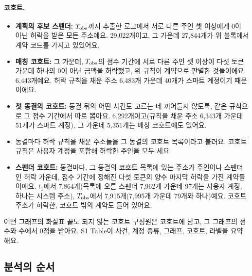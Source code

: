 \paragraph{코호트.}
\begin{itemize}
\item \textbf{계획의 후보 스펜더:} $T_{\mathrm{obs}}$까지 추출한 로그에서 서로 다른 주인 셋 이상에게 0이 아닌 허락을 받은 모든 주소예요. 29,022개이고, 그 가운데 27,844개가 위 블록에서 계약 코드를 가지고 있었어요.
\item \textbf{매칭 코호트:} 그 가운데, $T_{\mathrm{obs}}$의 점수 기간에 서로 다른 주인 셋 이상이 다섯 토큰 가운데 하나의 0이 아닌 금액을 허락했고, 위 규칙이 계약으로 판별한 것들이에요. 6,443개예요. 허락 규칙을 채운 주소 6,483개 가운데 40개가 스마트 계정이기 때문이에요.
\item \textbf{첫 동결의 코호트:} 동결 뒤의 어떤 사건도 고르는 데 끼어들지 않도록, 같은 규칙으로 그 점수 기간에서 따로 뽑아요. 6,292개이고(규칙을 채운 주소 6,343개 가운데 51개가 스마트 계정), 그 가운데 5,351개는 매칭 코호트에도 있어요.
\item 동결마다 허락 규칙을 채운 주소들을 그 동결의 코호트 목록이라고 불러요. 코호트 규칙은 사용자 계정을 포함해 허락한 주인을 모두 세요.
\item \textbf{스펜더 코호트:} 동결마다, 그 동결의 코호트 목록에 있는 주소가 주인이나 스펜더인 허락 가운데, 점수 기간에 정해진 다섯 토큰의 양수 마지막 허락을 가진 계약들이에요. $t_1$에서 7,864개(목록에 오른 스펜더 7,962개 가운데 97개는 사용자 계정, 하나는 시스템 주소), $T_{\mathrm{obs}}$에서 7,915개(7,995개 가운데 79개와 하나)예요. 코호트 주소가 허락한, 코호트 밖의 계약도 들어 있어요.
\end{itemize}
어떤 그래프의 화살표 끝도 되지 않는 코호트 구성원은 코호트에 남고, 그 그래프의 점수와 수에서 0점을 받아요. S1 Table이 사건, 계정 종류, 그래프, 코호트, 라벨을 요약해요.

\subsection{분석의 순서}
\label{sec:order}

